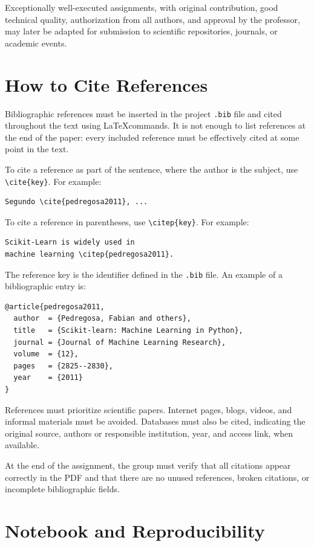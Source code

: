 \documentclass[a4paper]{ifacconf}
\begin{document}
Exceptionally well-executed assignments, with original contribution, good technical quality, authorization from all authors, and approval by the professor, may later be adapted for submission to scientific repositories, journals, or academic events.

\section{How to Cite References}

Bibliographic references must be inserted in the project \texttt{.bib} file and cited throughout the text using \LaTeX commands. It is not enough to list references at the end of the paper: every included reference must be effectively cited at some point in the text.

To cite a reference as part of the sentence, where the author is the subject, use \texttt{\textbackslash cite\{key\}}. For example:
\begin{verbatim}
Segundo \cite{pedregosa2011}, ...
\end{verbatim}

To cite a reference in parentheses, use \texttt{\textbackslash citep\{key\}}. For example:
\begin{verbatim}
Scikit-Learn is widely used in 
machine learning \citep{pedregosa2011}.
\end{verbatim}

The reference key is the identifier defined in the \texttt{.bib} file. An example of a bibliographic entry is:
\begin{verbatim}
@article{pedregosa2011,
  author  = {Pedregosa, Fabian and others},
  title   = {Scikit-learn: Machine Learning in Python},
  journal = {Journal of Machine Learning Research},
  volume  = {12},
  pages   = {2825--2830},
  year    = {2011}
}
\end{verbatim}

References must prioritize scientific papers. Internet pages, blogs, videos, and informal materials must be avoided. Databases must also be cited, indicating the original source, authors or responsible institution, year, and access link, when available.

At the end of the assignment, the group must verify that all citations appear correctly in the PDF and that there are no unused references, broken citations, or incomplete bibliographic fields.


\section{Notebook and Reproducibility}
\end{document}
